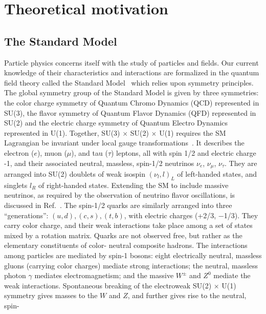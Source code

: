\clearpage
\section{Theoretical motivation\label{sec:theory}}

\subsection{The Standard Model\label{sec:SM}}

Particle physics concerns itself with the study of particles and fields. 
Our current knowledge of their characteristics and interactions are formalized
in the quantum field theory called the Standard Model~\cite{bettini2014introduction,griffiths2008introduction}
which relies upon symmetry 
principles. The global symmetry group of the Standard Model is given by three symmetries: 
the color charge symmetry of Quantum Chromo Dynamics (QCD) represented in SU(3), 
the flavor symmetry of Quantum Flavor Dynamics (QFD) represented in SU(2) and the electric charge symmetry of Quantum 
Electro Dynamics represented in U(1). Together, SU(3) $\times$  SU(2) $\times$ U(1) requires 
the SM Lagrangian be invariant under local gauge transformations~\cite{perkins2000introduction}. It describes the electron ($e$), 
muon ($\mu$), and tau ($\tau$) leptons, all with spin 1/2 and electric charge -1, and their 
associated neutral, massless, spin-1/2 neutrinos $\nu_{e}$, $\nu_{\mu}$, $\nu_{\tau}$. 
They are arranged into SU(2) doublets of weak isospin $(\nu_{l}, l)_L$ of left-handed
states, and singlets $l_R$ of right-handed states. Extending the SM to include massive
neutrinos, as required by the observation of neutrino flavor oscillations, is discussed
in Ref.~\cite{griffiths2008introduction}.
The spin-1/2 quarks are similarly arranged into three ``generations'': $(u, d), (c, s),
(t, b)$, with electric charges (+2/3, −1/3). They carry color charge, and their weak
interactions take place among a set of states mixed by a rotation matrix. Quarks
are not observed free, but rather as the elementary constituents of color-
neutral composite hadrons.
The interactions among particles are mediated by spin-1 bosons: eight electrically
neutral, massless gluons (carrying color charges) mediate strong interactions; the neutral, 
massless photon $\gamma$ mediates electromagnetism; and the massive $W^\pm$ and $Z^0$ mediate 
the weak interactions. Spontaneous breaking  of the electroweak SU(2) $\times$ U(1)
symmetry gives masses to the $W$ and $Z$, and further gives rise to the neutral, spin-
